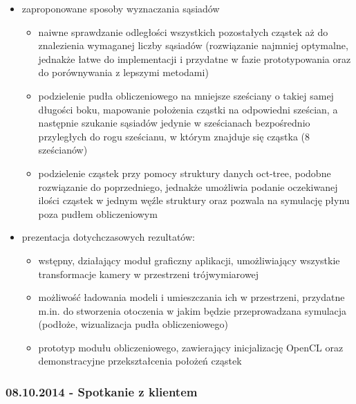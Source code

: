 \documentclass[polish, 12pt]{aghthesis}
\begin{document}
			\begin{itemize}
			
				\item zaproponowane sposoby wyznaczania sąsiadów
				
					\begin{itemize}
					
						\item naiwne sprawdzanie odległości wszystkich pozostałych cząstek aż do znalezienia wymaganej liczby sąsiadów (rozwiązanie najmniej optymalne, jednakże łatwe do implementacji i przydatne w fazie prototypowania oraz do porównywania z lepszymi metodami)
						\item podzielenie pudła obliczeniowego na mniejsze sześciany o takiej samej długości boku, mapowanie położenia cząstki na odpowiedni sześcian, a następnie szukanie sąsiadów jedynie w sześcianach bezpośrednio przyległych do rogu sześcianu, w którym znajduje się cząstka (8 sześcianów)
						\item podzielenie cząstek przy pomocy struktury danych oct-tree, podobne rozwiązanie do poprzedniego, jednakże umożliwia podanie oczekiwanej ilości cząstek w jednym węźle struktury oraz pozwala na symulację płynu poza pudłem obliczeniowym
					
					\end{itemize}
					
				\item prezentacja dotychczasowych rezultatów:
				
					\begin{itemize}
					
						\item wstępny, działający moduł graficzny aplikacji, umożliwiający wszystkie transformacje kamery w przestrzeni trójwymiarowej
						\item możliwość ładowania modeli i umieszczania ich w przestrzeni, przydatne m.in. do stworzenia otoczenia w jakim będzie przeprowadzana symulacja (podłoże, wizualizacja pudła obliczeniowego)
						\item prototyp modułu obliczeniowego, zawierający inicjalizację OpenCL oraz demonstracyjne przekształcenia położeń cząstek
					
					\end{itemize}
			
			\end{itemize}
		
		\subsubsection*{08.10.2014 - Spotkanie z klientem}
			
\end{document}
